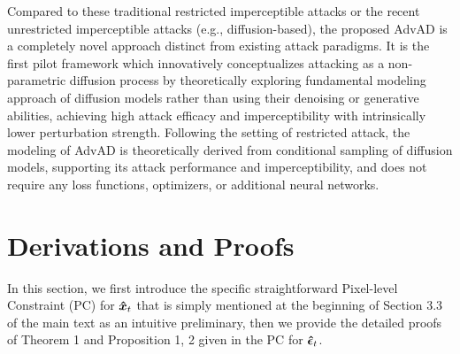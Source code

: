 \documentclass{article}
\begin{document}
Compared to these traditional restricted imperceptible attacks or the recent unrestricted imperceptible attacks (e.g., diffusion-based), the proposed AdvAD is a completely novel approach distinct from existing attack paradigms. It is the first pilot framework which innovatively conceptualizes attacking as a non-parametric diffusion process by theoretically exploring fundamental modeling approach of diffusion models rather than using their denoising or generative abilities, achieving high attack efficacy and imperceptibility with intrinsically lower perturbation strength. Following the setting of restricted attack, the modeling of AdvAD is theoretically derived from conditional sampling of diffusion models, supporting its attack performance and imperceptibility, and does not require any loss functions, optimizers, or additional neural networks.


\section{Derivations and Proofs} \label{app:B}
\label{sec:1}
In this section, we first introduce the specific straightforward Pixel-level Constraint (PC) for $\boldsymbol{\Hat{x}}_t$ that is simply mentioned at the beginning of Section 3.3 of the main text as an intuitive preliminary, then we provide the detailed proofs of Theorem 1 and Proposition 1, 2 given in the PC for $\boldsymbol{\Hat{\epsilon}}_t$.
\end{document}
